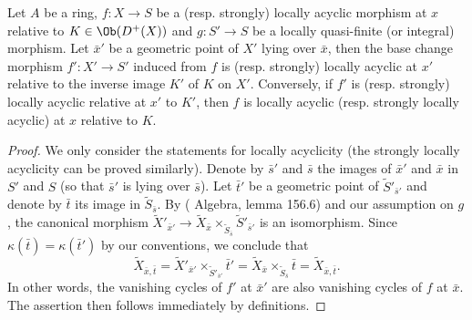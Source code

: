 \begin{proposition}\label{scheme morphism locally acyclic base change by quasi-finite}
Let $A$ be a ring, $f:X\to S$ be a (resp. strongly) locally acyclic morphism at $x$ relative to $K\in\Ob(D^+(X))$ and $g:S'\to S$ be a locally quasi-finite (or integral) morphism. Let $\bar{x}'$ be a geometric point of $X'$ lying over $\bar{x}$, then the base change morphism $f':X'\to S'$ induced from $f$ is (resp. strongly) locally acyclic at $x'$ relative to the inverse image $K'$ of $K$ on $X'$. Conversely, if $f'$ is (resp. strongly) locally acyclic relative at $x'$ to $K'$, then $f$ is locally acyclic (resp. strongly locally acyclic) at $x$ relative to $K$. 
\end{proposition}
\begin{proof}
We only consider the statements for locally acyclicity (the strongly locally acyclicity can be proved similarly). Denote by $\bar{s}'$ and $\bar{s}$ the images of $\bar{x}'$ and $\bar{x}$ in $S'$ and $S$ (so that $\bar{s}'$ is lying over $\bar{s}$). Let $\bar{t}'$ be a geometric point of $\widetilde{S}'_{\bar{s}'}$ and denote by $\bar{t}$ its image in $\widetilde{S}_{\bar{s}}$. By (\cite{SP} Algebra, lemma 156.6) and our assumption on $g$, the canonical morphism $\widetilde{X}'_{\bar{x}'}\to\widetilde{X}_{\bar{x}}\times_{\widetilde{S}_{\bar{s}}}\widetilde{S}'_{\bar{s}'}$ is an isomorphism. Since $\kappa(\bar{t})=\kappa(\bar{t}')$ by our conventions, we conclude that
\[\widetilde{X}_{\bar{x},\bar{t}}=\widetilde{X}'_{\bar{x}'}\times_{\widetilde{S}'_{\bar{s}'}}\bar{t}'=\widetilde{X}_{\bar{x}}\times_{\widetilde{S}_{\bar{s}}}\bar{t}=\widetilde{X}_{\bar{x},\bar{t}}.\]
In other words, the vanishing cycles of $f'$ at $\bar{x}'$ are also vanishing cycles of $f$ at $\bar{x}$. The assertion then follows immediately by definitions.
\end{proof}

